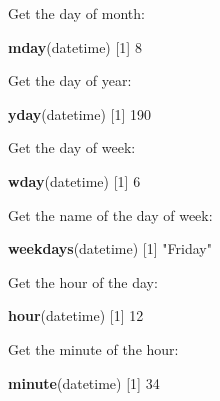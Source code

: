 \documentclass[]{book}
\newenvironment{Shaded}{\begin{snugshade}}{\end{snugshade}}
\newcommand{\DecValTok}[1]{\textcolor[rgb]{0.00,0.00,0.81}{#1}}
\newcommand{\KeywordTok}[1]{\textcolor[rgb]{0.13,0.29,0.53}{\textbf{#1}}}
\newcommand{\NormalTok}[1]{#1}
\newcommand{\StringTok}[1]{\textcolor[rgb]{0.31,0.60,0.02}{#1}}
\begin{document}
Get the day of month:

\begin{Shaded}
\begin{Highlighting}[]
\KeywordTok{mday}\NormalTok{(datetime)}
\NormalTok{[}\DecValTok{1}\NormalTok{] }\DecValTok{8}
\end{Highlighting}
\end{Shaded}

Get the day of year:

\begin{Shaded}
\begin{Highlighting}[]
\KeywordTok{yday}\NormalTok{(datetime)}
\NormalTok{[}\DecValTok{1}\NormalTok{] }\DecValTok{190}
\end{Highlighting}
\end{Shaded}

Get the day of week:

\begin{Shaded}
\begin{Highlighting}[]
\KeywordTok{wday}\NormalTok{(datetime)}
\NormalTok{[}\DecValTok{1}\NormalTok{] }\DecValTok{6}
\end{Highlighting}
\end{Shaded}

Get the name of the day of week:

\begin{Shaded}
\begin{Highlighting}[]
\KeywordTok{weekdays}\NormalTok{(datetime)}
\NormalTok{[}\DecValTok{1}\NormalTok{] }\StringTok{"Friday"}
\end{Highlighting}
\end{Shaded}

Get the hour of the day:

\begin{Shaded}
\begin{Highlighting}[]
\KeywordTok{hour}\NormalTok{(datetime)}
\NormalTok{[}\DecValTok{1}\NormalTok{] }\DecValTok{12}
\end{Highlighting}
\end{Shaded}

Get the minute of the hour:

\begin{Shaded}
\begin{Highlighting}[]
\KeywordTok{minute}\NormalTok{(datetime)}
\NormalTok{[}\DecValTok{1}\NormalTok{] }\DecValTok{34}
\end{Highlighting}
\end{Shaded}
\end{document}
